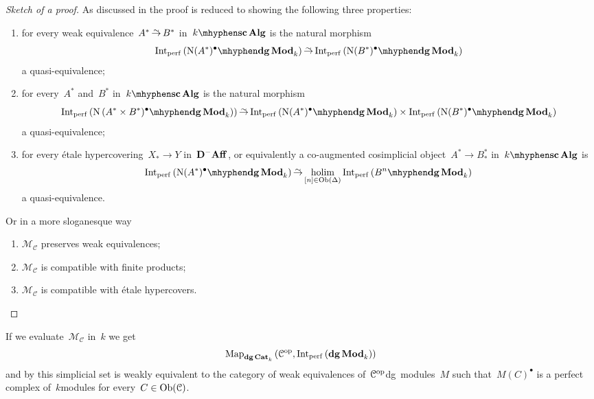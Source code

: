 \begin{refsection}
\begin{theorem}
  \begin{proof}[Sketch of a proof]
    As discussed in \cite[\S 2.1.1]{hagII} the proof is reduced to showing the following three properties:
    \begin{enumerate}
      \item for every weak equivalence~$A^*\weq B^*$ in~$\scAlg{k}$ is the natural morphism
        \begin{equation}
          \Int_\perf\left( \dgMod{\nerve(A^*)^\bullet}_k \right)\weq\Int_\perf\left( \dgMod{\nerve(B^*)^\bullet}_k \right)
        \end{equation}
        a quasi-equivalence;
      \item for every~$A^*$ and~$B^*$ in~$\scAlg{k}$ is the natural morphism
        \begin{equation}
          \Int_\perf\left( \dgMod{\nerve\left( A^*\times B^*)^\bullet}_k \right) \right)\weq\Int_\perf\left( \dgMod{\nerve(A^*)^\bullet}_k \right)\times\Int_\perf\left( \dgMod{\nerve(B^*)^\bullet}_k \right)
        \end{equation}
        a quasi-equivalence;
      \item for every \'etale hypercovering~$X_*\to Y$ in~$\mathbf{D}^-\mathbf{Aff}$, or equivalently a co-augmented cosimplicial object~$A^*\to B_*^*$ in~$\scAlg{k}$ is
        \begin{equation}
          \Int_\perf\left( \dgMod{\nerve(A^*)^\bullet}_k \right)\weq\holim_{[n]\in\Ob(\Delta)}\Int_\perf\left( \dgMod{B^n}_k \right)
        \end{equation}
        a quasi-equivalence.
    \end{enumerate}
    Or in a more sloganesque way
    \begin{enumerate}
      \item $\mathcal{M}_{\mathcal{C}}$ preserves weak equivalences;
      \item $\mathcal{M}_{\mathcal{C}}$ is compatible with finite products;
      \item $\mathcal{M}_{\mathcal{C}}$ is compatible with \'etale hypercovers.
    \end{enumerate}

  \end{proof}
\end{theorem}

\begin{example}
  If we evaluate~$\mathcal{M}_{\mathcal{C}}$ in~$k$ we get
  \begin{equation}
    \Map_{\dgCat_k}\left( \mathcal{C}^\opp,\Int_\perf\left( \dgMod_k \right) \right)
  \end{equation}
  and by \cite{toen} this simplicial set is weakly equivalent to the category of weak equivalences of~$\mathcal{C}^{\mathrm{op}}$\dash dg~modules~$M$ such that~$M(C)^\bullet$ is a perfect complex of~$k$\dash modules for every~$C\in\operatorname{Ob}(\mathcal{C})$.
\end{example}



\end{refsection}

